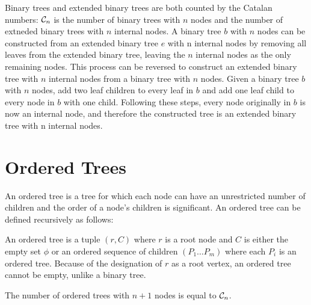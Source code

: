 Binary trees and extended binary trees are both counted by the Catalan numbers: $\mathcal{C}_n$ is the number of binary trees with $n$ nodes and the number of extneded binary trees with $n$ internal nodes.  
A binary tree $b$ with $n$ nodes can be constructed from an extended binary tree $e$ with n internal nodes by removing all leaves from the extended binary tree, leaving the $n$ internal nodes as the only remaining nodes.
This process can be reversed to construct an extended binary tree with $n$ internal nodes from a binary tree with $n$ nodes. Given a binary tree $b$ with $n$ nodes, add two leaf children to every leaf in $b$ and add one leaf child to every node in $b$ with one child. Following these steps, every node originally in $b$ is now an internal node, and therefore the constructed tree is an extended binary tree with n internal nodes.

\section{Ordered Trees} \label{sec:otrees}

An ordered tree is a tree for which each node can have an unrestricted number of children and the order of a node's children is significant.  An ordered tree can be defined recursively as follows:


An ordered tree is a tuple $(r,C)$ where $r$ is a root node and $C$ is either the empty set $\phi$ or an ordered sequence of children $(P_1\dots P_m)$ where each $P_i$ is an ordered tree.  Because of the designation of $r$ as a root vertex, an ordered tree cannot be empty, unlike a binary tree.

The number of ordered trees with $n+1$ nodes is equal to $\mathcal{C}_n$.

